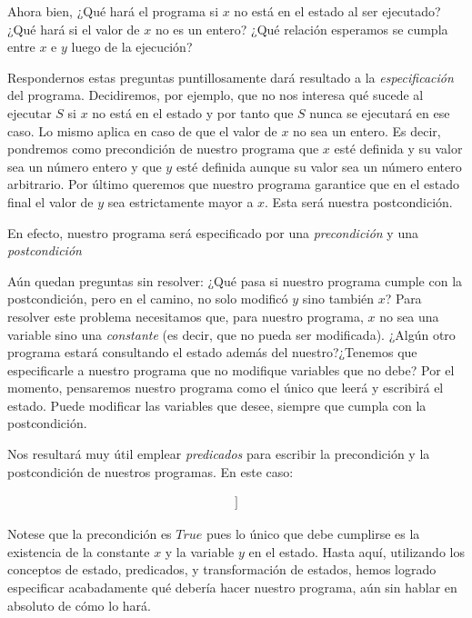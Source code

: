\documentclass[12pt, a4paper, openany, fleqn]{book}
\begin{document}
    Ahora bien,
    ¿Qué hará el programa si $x$ no está en el estado al ser ejecutado?
    ¿Qué hará si el valor de $x$ no es un entero?
    ¿Qué relación esperamos se cumpla entre $x$ e $y$ luego de la ejecución?

    Respondernos estas preguntas puntillosamente dará resultado a la \textit{especificación} del programa.
    Decidiremos, por ejemplo, que no nos interesa qué sucede al ejecutar $S$ si $x$ no está en el estado y por tanto que $S$ nunca se ejecutará en ese caso. Lo mismo aplica en caso de que el valor de $x$ no sea un entero. Es decir, pondremos como precondición de nuestro programa que $x$ esté definida y su valor sea un número entero y que $y$ esté definida aunque su valor sea un número entero arbitrario. Por último queremos que nuestro programa garantice que en el estado final el valor de $y$ sea estrictamente mayor a $x$. Esta será nuestra postcondición.

    En efecto, nuestro programa será especificado por una \textit{precondición} y una \textit{postcondición}

    Aún quedan preguntas sin resolver:
    ¿Qué pasa si nuestro programa cumple con la postcondición, pero en el camino, no solo modificó $y$ sino también $x$? Para resolver este problema necesitamos que, para nuestro programa, $x$ no sea una variable sino una \textit{constante} (es decir, que no pueda ser modificada).
    ¿Algún otro programa estará consultando el estado además del nuestro?¿Tenemos que especificarle a nuestro programa que no modifique variables que no debe? Por el momento, pensaremos nuestro programa como el único que leerá y escribirá el estado. Puede modificar las variables que desee, siempre que cumpla con la postcondición.

    Nos resultará muy útil emplear \textit{predicados} para escribir la precondición y la postcondición de nuestros programas. En este caso:

    \begin{align*}
        [[& \text{const x} \in \mathbb{Z} \\
          & \text{var y} \in \mathbb{Z} \\
          & \lbrace {True} \rbrace \\
          & S \\
          & \lbrace {y > x} \rbrace \\
        ]]
    \end{align*}

    Notese que la precondición es $True$ pues lo único que debe cumplirse es la existencia de la constante $x$ y la variable $y$ en el estado.
    Hasta aquí, utilizando los conceptos de estado, predicados, y transformación de estados, hemos logrado especificar acabadamente qué debería hacer nuestro programa, aún sin hablar en absoluto de cómo lo hará.
\end{document}
